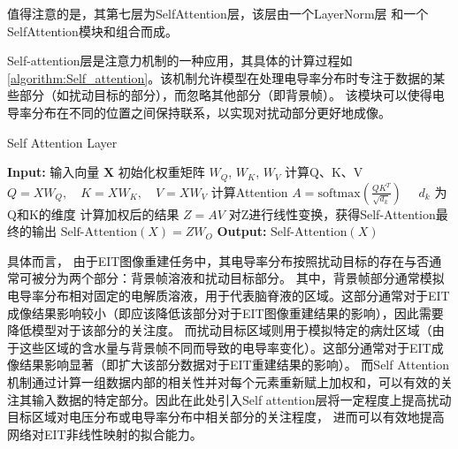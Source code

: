     值得注意的是，其第七层为SelfAttention层，该层由一个LayerNorm层 和一个SelfAttention模块和组合而成。
    
    Self-attention层是注意力机制的一种应用，其具体的计算过程如\cref{algorithm:Self_attention}。该机制允许模型在处理电导率分布时专注于数据的某些部分（如扰动目标的部分），而忽略其他部分（即背景帧）。
    该模块可以使得电导率分布在不同的位置之间保持联系，以实现对扰动部分更好地成像。
    
\begin{algorithm}[H]
    
    \caption{Self Attention Layer}
    \begin{algorithmic}[1]
        \State \textbf{Input:} 输入向量 $\boldsymbol{X}$
        \State 初始化权重矩阵 $W_Q$, $W_K$, $W_V$
        \State 计算Q、K、V $Q = XW_Q, \quad K = XW_K, \quad V = XW_V$
        \State 计算Attention  $A = \text{softmax}\left(\frac{QK^T}{\sqrt{d_k}}\right) \quad $ $d_k$ 为Q和K的维度 
        \State 计算加权后的结果 $Z = AV$
        \State 对Z进行线性变换，获得Self-Attention最终的输出  $\text{Self-Attention}(X) = ZW_O$
        \State \textbf{Output:} $\text{Self-Attention}(X)$
    \end{algorithmic}
    \label{algorithm:Self_attention}
\end{algorithm}

    具体而言， 由于EIT图像重建任务中，其电导率分布按照扰动目标的存在与否通常可被分为两个部分：背景帧溶液和扰动目标部分。
    其中，背景帧部分通常模拟电导率分布相对固定的电解质溶液，用于代表脑脊液的区域。这部分通常对于EIT成像结果影响较小（即应该降低该部分对于EIT图像重建结果的影响），因此需要降低模型对于该部分的关注度。
    而扰动目标区域则用于模拟特定的病灶区域（由于这些区域的含水量与背景帧不同而导致的电导率变化）。这部分通常对于EIT成像结果影响显著（即扩大该部分数据对于EIT重建结果的影响）。
    而Self Attention机制通过计算一组数据内部的相关性并对每个元素重新赋上加权和，可以有效的关注其输入数据的特定部分。因此在此处引入Self attention层将一定程度上提高扰动目标区域对电压分布或电导率分布中相关部分的关注程度，
    进而可以有效地提高网络对EIT非线性映射的拟合能力。


